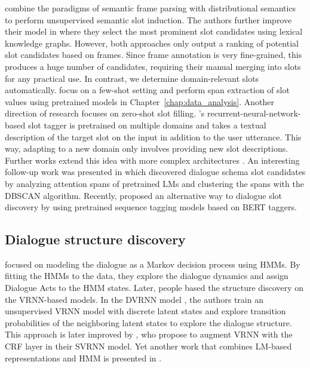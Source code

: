 \label{sec:relwork-chen}
\citet{chen2014leveraging} combine the paradigms of semantic frame parsing with distributional semantics to perform unsupervised semantic slot induction.
The authors further improve their model in \citet{chen2015jointly} where they select the most prominent slot candidates using lexical knowledge graphs.
However, both approaches only output a ranking of potential slot candidates based on frames.
Since frame annotation is very fine-grained, this produces a huge number of candidates, requiring their manual merging  %
into slots for any practical use.
In contrast, we determine domain-relevant slots automatically.
\citet{coope_span-convert_2020} focus on a few-shot setting and perform span extraction of slot values using pretrained models in Chapter~\ref{chap:data_analysis}.
Another direction of research focuses on zero-shot slot filling.  \citet{bapna2017towards}'s recurrent-neural-network-based slot tagger is pretrained on multiple domains and takes a textual description of the target slot on the input in addition to the user utterance. This way, adapting to a new domain only involves providing new slot descriptions.
Further works extend this idea with more complex architectures \cite{shah2019robust,liu2020coach}.
An interesting follow-up work was presented in \citet{yu-etal-2022-unsupervised} which discovered dialogue schema slot candidates by analyzing attention spans of pretrained LMs and clustering the spans with the DBSCAN algorithm.
Recently, \citet{qiu2022structure} proposed an alternative way to dialogue slot discovery by using pretrained sequence tagging models based on BERT taggers.

\subsection{Dialogue structure discovery}
\citet{brychcin2016unsupervised} focused on modeling the dialogue as a Markov decision process using HMMs.
By fitting the HMMs to the data, they explore the dialogue dynamics and assign Dialogue Acts to the HMM states.
Later, people based the structure discovery on the VRNN-based models.
In the DVRNN model \cite{shi2019unsupervised}, the authors train an unsupervised VRNN model with discrete latent states and explore transition probabilities of the neighboring latent states to explore the dialogue structure.
This approach is later improved by \citet{qiu-etal-2020-structured}, who propose to augment VRNN with the CRF layer in their SVRNN model.
Yet another work that combines LM-based representations and HMM is presented in \citet{lu-etal-2022-unsupervised}.


